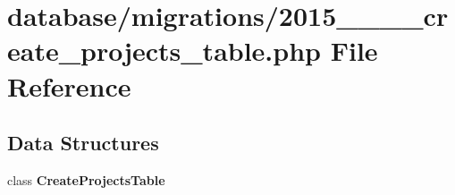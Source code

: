 \section{database/migrations/2015\+\_\+\_\+\_\+\_\+create\+\_\+projects\+\_\+table.php File Reference}
\label{2015__03__09__2__create__projects__table_8php}
\subsection*{Data Structures}
\begin{DoxyCompactItemize}
\item 
class {\bf Create\+Projects\+Table}
\end{DoxyCompactItemize}
